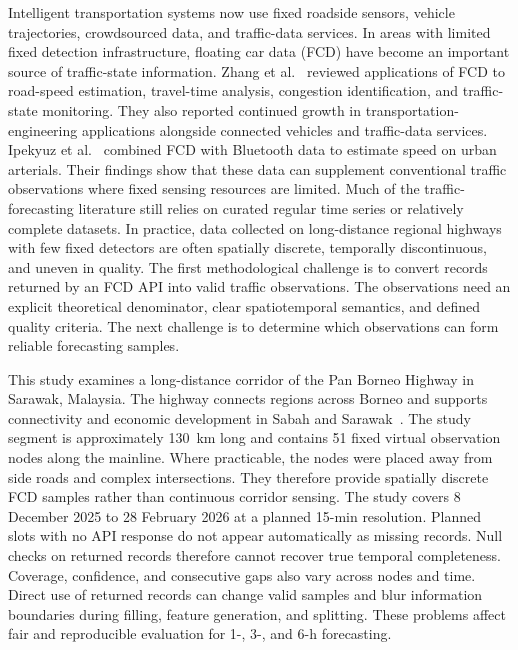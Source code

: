 \documentclass[pdflatex,sn-mathphys-num,iicol]{sn-jnl}
\begin{document}
Intelligent transportation systems now use fixed roadside sensors, vehicle trajectories, crowdsourced data, and traffic-data services. In areas with limited fixed detection infrastructure, floating car data (FCD) have become an important source of traffic-state information. Zhang et al.~\cite{Zhang2025FCD} reviewed applications of FCD to road-speed estimation, travel-time analysis, congestion identification, and traffic-state monitoring. They also reported continued growth in transportation-engineering applications alongside connected vehicles and traffic-data services. Ipekyuz et al.~\cite{Ipekyuz2025FCD} combined FCD with Bluetooth data to estimate speed on urban arterials. Their findings show that these data can supplement conventional traffic observations where fixed sensing resources are limited. Much of the traffic-forecasting literature still relies on curated regular time series or relatively complete datasets. In practice, data collected on long-distance regional highways with few fixed detectors are often spatially discrete, temporally discontinuous, and uneven in quality. The first methodological challenge is to convert records returned by an FCD API into valid traffic observations. The observations need an explicit theoretical denominator, clear spatiotemporal semantics, and defined quality criteria. The next challenge is to determine which observations can form reliable forecasting samples.

This study examines a long-distance corridor of the Pan Borneo Highway in Sarawak, Malaysia. The highway connects regions across Borneo and supports connectivity and economic development in Sabah and Sarawak~\cite{Kam2025PanBorneo,Azmi2025PanBorneo}. The study segment is approximately 130~km long and contains 51 fixed virtual observation nodes along the mainline. Where practicable, the nodes were placed away from side roads and complex intersections. They therefore provide spatially discrete FCD samples rather than continuous corridor sensing. The study covers 8 December 2025 to 28 February 2026 at a planned 15-min resolution. Planned slots with no API response do not appear automatically as missing records. Null checks on returned records therefore cannot recover true temporal completeness. Coverage, confidence, and consecutive gaps also vary across nodes and time. Direct use of returned records can change valid samples and blur information boundaries during filling, feature generation, and splitting. These problems affect fair and reproducible evaluation for 1-, 3-, and 6-h forecasting.
\end{document}

